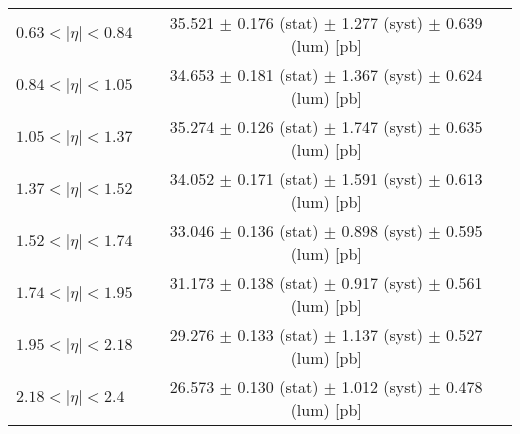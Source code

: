 \begin{tabular}{lc}
$0.63 < |\eta| <0.84$          & 35.521 $\pm$ 0.176 (stat) $\pm$ 1.277 (syst) $\pm$ 0.639 (lum) [pb]  \\
$0.84 < |\eta| <1.05$          & 34.653 $\pm$ 0.181 (stat) $\pm$ 1.367 (syst) $\pm$ 0.624 (lum) [pb]  \\
$1.05 < |\eta| <1.37$          & 35.274 $\pm$ 0.126 (stat) $\pm$ 1.747 (syst) $\pm$ 0.635 (lum) [pb]  \\
$1.37 < |\eta| <1.52$          & 34.052 $\pm$ 0.171 (stat) $\pm$ 1.591 (syst) $\pm$ 0.613 (lum) [pb]  \\
$1.52 < |\eta| <1.74$          & 33.046 $\pm$ 0.136 (stat) $\pm$ 0.898 (syst) $\pm$ 0.595 (lum) [pb]  \\
$1.74 < |\eta| <1.95$          & 31.173 $\pm$ 0.138 (stat) $\pm$ 0.917 (syst) $\pm$ 0.561 (lum) [pb]  \\
$1.95 < |\eta| <2.18$          & 29.276 $\pm$ 0.133 (stat) $\pm$ 1.137 (syst) $\pm$ 0.527 (lum) [pb]  \\
$2.18 < |\eta| <2.4$           & 26.573 $\pm$ 0.130 (stat) $\pm$ 1.012 (syst) $\pm$ 0.478 (lum) [pb]  \\
\hline
\end{tabular}
